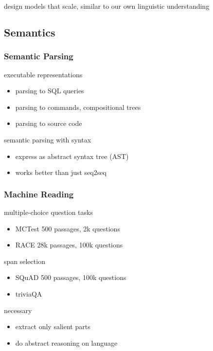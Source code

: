 \documentclass[]{article}
\theoremstyle{definition}
\begin{document}
    design models that scale, similar to our own linguistic understanding

    \subsection{Semantics}%
    \label{sub:semantics}

    \subsubsection{Semantic Parsing}%
    \label{ssub:semantic_parsing}

    executable representations
    \begin{itemize}
        \item parsing to SQL queries
        \item parsing to commands, compositional trees
        \item parsing to source code
    \end{itemize}

    semantic parsing with syntax
    \begin{itemize}
        \item express as abstract syntax tree (AST)
        \item works better than just seq2seq
    \end{itemize}


    \subsubsection{Machine Reading}%
    \label{ssub:machine_reading}

    multiple-choice question tasks
    \begin{itemize}
        \item MCTest 500 passages, 2k questions
        \item RACE 28k passages, 100k questions
    \end{itemize}

    span selection
    \begin{itemize}
        \item SQuAD 500 passages, 100k questions
        \item triviaQA
    \end{itemize}

    necessary
    \begin{itemize}
        \item extract only salient parts
        \item do abstract reasoning on language
    \end{itemize}
\end{document}

